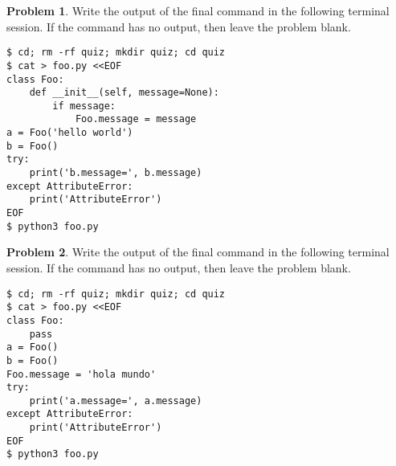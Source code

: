 \documentclass[10pt]{article}
\theoremstyle{definition}
\newtheorem{problem}{Problem}
\begin{document}
\filbreak
\begin{problem}
    Write the output of the final command in the following terminal session.
    If the command has no output, then leave the problem blank.
\end{problem}
\begin{lstlisting}
$ cd; rm -rf quiz; mkdir quiz; cd quiz
$ cat > foo.py <<EOF
class Foo:
    def __init__(self, message=None):
        if message:
            Foo.message = message
a = Foo('hello world')
b = Foo()
try:
    print('b.message=', b.message)
except AttributeError:
    print('AttributeError') 
EOF
$ python3 foo.py
\end{lstlisting}

\vspace{1in}
\filbreak
\begin{problem}
    Write the output of the final command in the following terminal session.
    If the command has no output, then leave the problem blank.
\end{problem}
\begin{lstlisting}
$ cd; rm -rf quiz; mkdir quiz; cd quiz
$ cat > foo.py <<EOF
class Foo:
    pass
a = Foo()
b = Foo()
Foo.message = 'hola mundo'
try:
    print('a.message=', a.message)
except AttributeError:
    print('AttributeError') 
EOF
$ python3 foo.py
\end{lstlisting}
\end{document}
